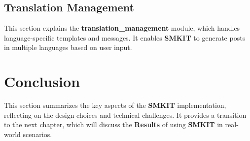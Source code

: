 \subsection{Translation Management}
\label{subsec:translation_management}
This section explains the \textbf{translation\_management} module, which handles language-specific templates and messages. It enables \textbf{SMKIT} to generate posts in multiple languages based on user input.

\section{Conclusion}
\label{sec:implementation_conclusion}
This section summarizes the key aspects of the \textbf{SMKIT} implementation, reflecting on the design choices and technical challenges. It provides a transition to the next chapter, which will discuss the \textbf{Results} of using \textbf{SMKIT} in real-world scenarios.
